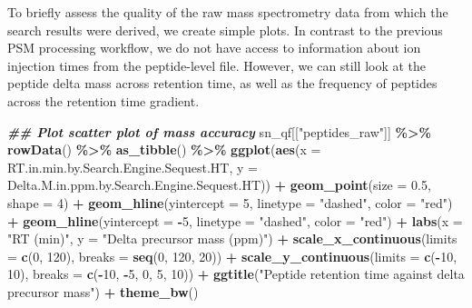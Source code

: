 \documentclass[9pt,a4paper,]{extarticle}
\newenvironment{Shaded}{\begin{snugshade}}{\end{snugshade}}
\newcommand{\AttributeTok}[1]{\textcolor[rgb]{0.13,0.29,0.53}{#1}}
\newcommand{\DecValTok}[1]{\textcolor[rgb]{0.00,0.00,0.81}{#1}}
\newcommand{\DocumentationTok}[1]{\textcolor[rgb]{0.56,0.35,0.01}{\textbf{\textit{#1}}}}
\newcommand{\FloatTok}[1]{\textcolor[rgb]{0.00,0.00,0.81}{#1}}
\newcommand{\FunctionTok}[1]{\textcolor[rgb]{0.13,0.29,0.53}{\textbf{#1}}}
\newcommand{\NormalTok}[1]{#1}
\newcommand{\SpecialCharTok}[1]{\textcolor[rgb]{0.81,0.36,0.00}{\textbf{#1}}}
\newcommand{\StringTok}[1]{\textcolor[rgb]{0.31,0.60,0.02}{#1}}
\begin{document}
To briefly assess the quality of the raw mass spectrometry data from which the
search results were derived, we create simple plots. In contrast to the previous
PSM processing workflow, we do not have access to information about ion injection
times from the peptide-level file. However, we can still look at the peptide
delta mass across retention time, as well as the frequency of peptides across
the retention time gradient.

\begin{Shaded}
\begin{Highlighting}[]
\DocumentationTok{\#\# Plot scatter plot of mass accuracy}
\NormalTok{sn\_qf[[}\StringTok{"peptides\_raw"}\NormalTok{]] }\SpecialCharTok{\%\textgreater{}\%}
  \FunctionTok{rowData}\NormalTok{() }\SpecialCharTok{\%\textgreater{}\%}
  \FunctionTok{as\_tibble}\NormalTok{() }\SpecialCharTok{\%\textgreater{}\%}
  \FunctionTok{ggplot}\NormalTok{(}\FunctionTok{aes}\NormalTok{(}\AttributeTok{x =}\NormalTok{ RT.in.min.by.Search.Engine.Sequest.HT,}
             \AttributeTok{y =}\NormalTok{ Delta.M.in.ppm.by.Search.Engine.Sequest.HT)) }\SpecialCharTok{+}
  \FunctionTok{geom\_point}\NormalTok{(}\AttributeTok{size =} \FloatTok{0.5}\NormalTok{, }\AttributeTok{shape =} \DecValTok{4}\NormalTok{) }\SpecialCharTok{+}
  \FunctionTok{geom\_hline}\NormalTok{(}\AttributeTok{yintercept =} \DecValTok{5}\NormalTok{, }\AttributeTok{linetype =} \StringTok{"dashed"}\NormalTok{, }\AttributeTok{color =} \StringTok{"red"}\NormalTok{) }\SpecialCharTok{+}
  \FunctionTok{geom\_hline}\NormalTok{(}\AttributeTok{yintercept =} \SpecialCharTok{{-}}\DecValTok{5}\NormalTok{, }\AttributeTok{linetype =} \StringTok{"dashed"}\NormalTok{, }\AttributeTok{color =} \StringTok{"red"}\NormalTok{) }\SpecialCharTok{+}
  \FunctionTok{labs}\NormalTok{(}\AttributeTok{x =} \StringTok{"RT (min)"}\NormalTok{, }\AttributeTok{y =} \StringTok{"Delta precursor mass (ppm)"}\NormalTok{) }\SpecialCharTok{+}
  \FunctionTok{scale\_x\_continuous}\NormalTok{(}\AttributeTok{limits =} \FunctionTok{c}\NormalTok{(}\DecValTok{0}\NormalTok{, }\DecValTok{120}\NormalTok{), }\AttributeTok{breaks =} \FunctionTok{seq}\NormalTok{(}\DecValTok{0}\NormalTok{, }\DecValTok{120}\NormalTok{, }\DecValTok{20}\NormalTok{)) }\SpecialCharTok{+}
  \FunctionTok{scale\_y\_continuous}\NormalTok{(}\AttributeTok{limits =} \FunctionTok{c}\NormalTok{(}\SpecialCharTok{{-}}\DecValTok{10}\NormalTok{, }\DecValTok{10}\NormalTok{), }\AttributeTok{breaks =} \FunctionTok{c}\NormalTok{(}\SpecialCharTok{{-}}\DecValTok{10}\NormalTok{, }\SpecialCharTok{{-}}\DecValTok{5}\NormalTok{, }\DecValTok{0}\NormalTok{, }\DecValTok{5}\NormalTok{, }\DecValTok{10}\NormalTok{)) }\SpecialCharTok{+}
  \FunctionTok{ggtitle}\NormalTok{(}\StringTok{"Peptide retention time against delta precursor mass"}\NormalTok{) }\SpecialCharTok{+}
  \FunctionTok{theme\_bw}\NormalTok{()}
\end{Highlighting}
\end{Shaded}
\end{document}
